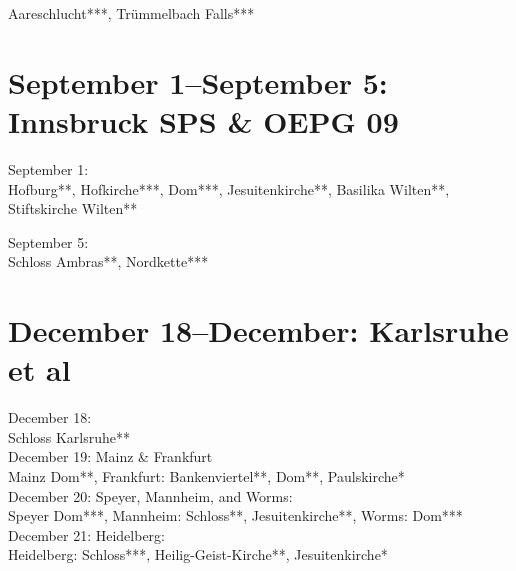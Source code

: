 Aareschlucht***, Tr\"ummelbach Falls***

\section{September 1--September 5: Innsbruck SPS \& OEPG 09}
\label{2009:Innsbruck}

September 1:\\

Hofburg**, Hofkirche***, Dom***, Jesuitenkirche**, Basilika Wilten**, Stiftskirche Wilten**

September 5:\\

Schloss Ambras**, Nordkette***

\section{December 18--December: Karlsruhe et al}

December 18:\\
Schloss Karlsruhe**\\

December 19: Mainz \& Frankfurt\\
Mainz Dom**, Frankfurt: Bankenviertel**, Dom**, Paulskirche*\\

December 20: Speyer, Mannheim, and Worms:\\
Speyer Dom***, Mannheim: Schloss**, Jesuitenkirche**, Worms: Dom***\\

December 21: Heidelberg:\\
Heidelberg: Schloss***, Heilig-Geist-Kirche**, Jesuitenkirche*